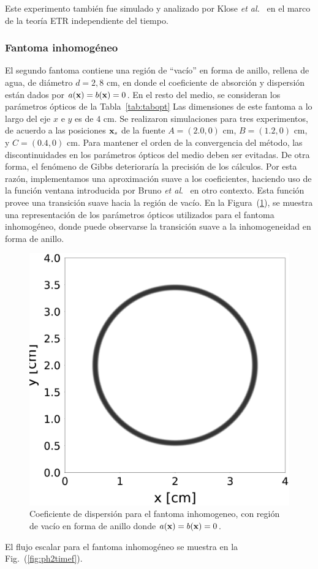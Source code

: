 Este experimento también fue simulado y analizado por Klose {\it et al.}~\cite{Klose2002}
en el marco de la teoría ETR independiente del tiempo.

\subsubsection{Fantoma inhomogéneo}

El segundo fantoma contiene una región de ``vacío'' en forma de anillo, 
rellena de agua, de diámetro $d=2,8$ cm, en donde el coeficiente de absorción 
y dispersión están dados por $a(\mathbf{x})=b(\mathbf{x})=0$. En el resto del medio, 
se consideran los parámetros ópticos de la Tabla~\ref{tab:tabopt}
Las dimensiones de este fantoma a lo largo del eje $x$ e $y$ es de $4$ cm.
Se realizaron simulaciones para tres experimentos, de acuerdo a las posiciones 
$\mathbf{x}_s$ de la fuente $A=(2.0,0)$ cm, $B=(1.2,0)$ cm, 
y $C=(0.4,0)$ cm.
Para mantener el orden de la convergencia del método, las discontinuidades
 en los parámetros ópticos del medio 
deben ser evitadas. De otra forma, el fenómeno de Gibbs deterioraría 
la precisión de los cálculos. Por esta razón, implementamos una aproximación 
suave a los coeficientes, haciendo uso de la función ventana introducida 
por Bruno \textit{et al}.~\cite{Bruno2014a} en otro contexto. 
Esta función provee una transición suave hacia la región de 
vacío.
En la Figura~(\ref{fig:scattcoef}), se muestra una representación de los 
parámetros ópticos utilizados para el fantoma inhomogéneo, 
donde puede observarse la transición suave a la inhomogeneidad 
en forma de anillo.
 \begin{figure}[h!]
\centering
  \includegraphics[width=0.35\linewidth]{figuras/sigs.eps}
  \caption{Coeficiente de dispersión para el fantoma inhomogeneo, 
  con región de vacío en forma de anillo donde  $a(\mathbf{x})=b(\mathbf{x})=0$.}
 \label{fig:scattcoef}
\end{figure}
El flujo escalar para el fantoma inhomogéneo se muestra en la Fig.~(\ref{fig:ph2timef}). 
